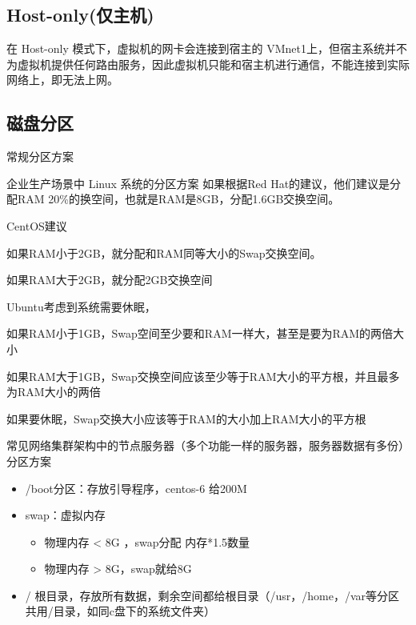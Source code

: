\subsection{Host-only(仅主机)}
在 Host-only 模式下，虚拟机的网卡会连接到宿主的 VMnet1上，但宿主系统并不为虚拟机提供任何路由服务，因此虚拟机只能和宿主机进行通信，不能连接到实际网络上，即无法上网。

\subsection{磁盘分区}
常规分区方案
\begin{ascboxD}{企业生产场景中 Linux 系统的分区方案}
如果根据Red Hat的建议，他们建议是分配RAM 20\%的换空间，也就是RAM是8GB，分配1.6GB交换空间。

CentOS建议

如果RAM小于2GB，就分配和RAM同等大小的Swap交换空间。

如果RAM大于2GB，就分配2GB交换空间

Ubuntu考虑到系统需要休眠，

如果RAM小于1GB，Swap空间至少要和RAM一样大，甚至是要为RAM的两倍大小

如果RAM大于1GB，Swap交换空间应该至少等于RAM大小的平方根，并且最多为RAM大小的两倍

如果要休眠，Swap交换大小应该等于RAM的大小加上RAM大小的平方根
\end{ascboxD}

\begin{ascboxD}{常见网络集群架构中的节点服务器（多个功能一样的服务器，服务器数据有多份）分区方案}
	\begin{itemize}
		\item /boot分区：存放引导程序，centos-6 给200M
		\item swap：虚拟内存
	\begin{itemize}
		\item 物理内存 < 8G ，swap分配 内存*1.5数量
		
		\item 物理内存 > 8G，swap就给8G
		
	\end{itemize}
		\item 
		/ 根目录，存放所有数据，剩余空间都给根目录（/usr，/home，/var等分区共用/目录，如同c盘下的系统文件夹）
	\end{itemize}
\end{ascboxD}

